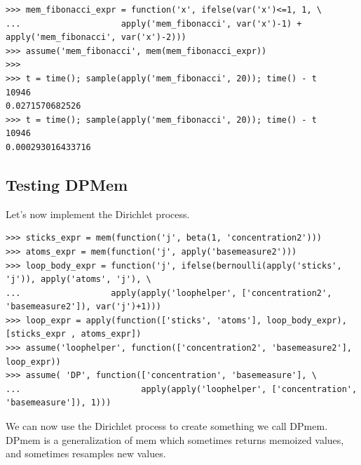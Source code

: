 \documentclass[11pt]{article}
\begin{document}
\begin{small}
\begin{verbatim}
>>> mem_fibonacci_expr = function('x', ifelse(var('x')<=1, 1, \
...                    apply('mem_fibonacci', var('x')-1) + apply('mem_fibonacci', var('x')-2)))
>>> assume('mem_fibonacci', mem(mem_fibonacci_expr))
>>>
>>> t = time(); sample(apply('mem_fibonacci', 20)); time() - t
10946
0.0271570682526
>>> t = time(); sample(apply('mem_fibonacci', 20)); time() - t
10946
0.000293016433716
\end{verbatim}
\end{small}

\subsection{Testing DPMem}

Let's now implement the Dirichlet process.  

\begin{small}
\begin{verbatim}
>>> sticks_expr = mem(function('j', beta(1, 'concentration2')))
>>> atoms_expr = mem(function('j', apply('basemeasure2')))
>>> loop_body_expr = function('j', ifelse(bernoulli(apply('sticks', 'j')), apply('atoms', 'j'), \
...                  apply(apply('loophelper', ['concentration2', 'basemeasure2']), var('j')+1)))
>>> loop_expr = apply(function(['sticks', 'atoms'], loop_body_expr), [sticks_expr , atoms_expr])
>>> assume('loophelper', function(['concentration2', 'basemeasure2'], loop_expr))
>>> assume( 'DP', function(['concentration', 'basemeasure'], \
...                        apply(apply('loophelper', ['concentration', 'basemeasure']), 1)))
\end{verbatim}
\end{small}

We can now use the Dirichlet process to create something we call DPmem.  DPmem is a generalization of mem which sometimes returns memoized values, and sometimes resamples new values.  
\end{document}
